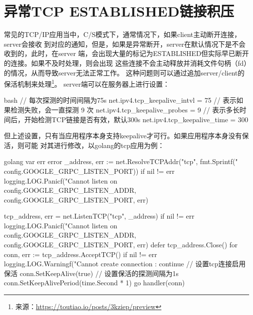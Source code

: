 \section{异常TCP ESTABLISHED链接积压}
常见的TCP/IP应用当中，C/S模式下，通常情况下，如果client主动断开连接，server会接收
到对应的通知，但是，如果是异常断开，server在默认情况下是不会收到的，此时，在server
端，会出现大量的标记为ESTABLISHED但实际早已断开的连接。如果不及时处理，则会出现
这些连接不会主动释放并消耗文件句柄（fd）的情况，从而导致server无法正常工作。
这种问题则可以通过追加server/client的保活机制来处理\footnote{来源：\url{https://toutiao.io/posts/3kziep/preview}}。
server端可以在服务器上进行设置：
\begin{code-block}{bash}
// 每次探测的时间间隔为75s
net.ipv4.tcp_keepalive_intvl = 75
// 表示如果检测失败，会一直探测 9 次
net.ipv4.tcp_keepalive_probes = 9
// 表示多长时间后，开始检测TCP链接是否有效，默认300s
net.ipv4.tcp_keepalive_time = 300
\end{code-block}
但上述设置，只有当应用程序本身支持keepalive才可行。如果应用程序本身没有保活，则可能
对其进行修改，以golang的tcp应用为例：
\begin{code-block}{golang}
var err error
_address, err := net.ResolveTCPAddr("tcp",
    fmt.Sprintf("%
        config.GOOGLE_GRPC_LISTEN_PORT))
if nil != err {
        logging.LOG.Panicf("Cannot listen on %
            config.GOOGLE_GRPC_LISTEN_ADDR,
            config.GOOGLE_GRPC_LISTEN_PORT, err)
}

tcp_address, err = net.ListenTCP("tcp", _address)
if nil != err {
        logging.LOG.Panicf("Cannot listen on %
            config.GOOGLE_GRPC_LISTEN_ADDR,
            config.GOOGLE_GRPC_LISTEN_PORT, err)
}
defer tcp_address.Close()
for {
        conn, err := tcp_address.AcceptTCP()
        if nil != err {
                logging.LOG.Warningf("Cannot create connection :%
                continue
        }
        // 设置tcp连接启用保活
        conn.SetKeepAlive(true)
        // 设置保活的探测间隔为1s
        conn.SetKeepAlivePeriod(time.Second * 1)
        go handler(conn)
}
\end{code-block}

